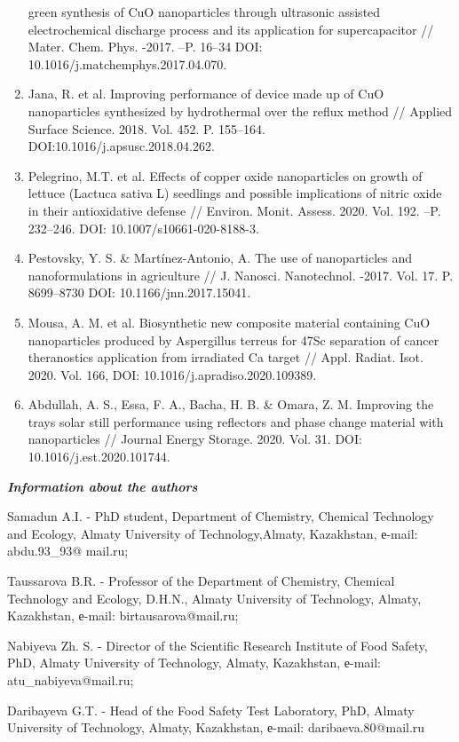 \begin{enumerate}
  green synthesis of CuO nanoparticles through ultrasonic assisted
  electrochemical discharge process and its application for
  supercapacitor // Mater. Chem. Phys. -2017. --P. 16--34 DOI:
  10.1016/j.matchemphys.2017.04.070.
\item
  Jana, R. et al. Improving performance of device made up of CuO
  nanoparticles synthesized by hydrothermal over the reflux method //
  Applied Surface Science. 2018. Vol. 452. P. 155--164.
  DOI:10.1016/j.apsusc.2018.04.262.
\item
  Pelegrino, M.T. et al. Effects of copper oxide nanoparticles on growth
  of lettuce (Lactuca sativa L) seedlings and possible implications of
  nitric oxide in their antioxidative defense // Environ. Monit. Assess.
  2020. Vol. 192. --P. 232--246. DOI: 10.1007/s10661-020-8188-3.
\item
  Pestovsky, Y. S. \& Martínez-Antonio, A. The use of nanoparticles and
  nanoformulations in agriculture // J. Nanosci. Nanotechnol. -2017.
  Vol. 17. P. 8699--8730 DOI: 10.1166/jnn.2017.15041.
\item
  Mousa, A. M. et al. Biosynthetic new composite material containing CuO
  nanoparticles produced by Aspergillus terreus for 47Sc separation of
  cancer theranostics application from irradiated Ca target // Appl.
  Radiat. Isot. 2020. Vol. 166, DOI: 10.1016/j.apradiso.2020.109389.
\item
  Abdullah, A. S., Essa, F. A., Bacha, H. B. \& Omara, Z. M. Improving
  the trays solar still performance using reflectors and phase change
  material with nanoparticles // Journal Energy Storage. 2020. Vol. 31.
  DOI: 10.1016/j.est.2020.101744.
\end{enumerate}

\emph{{\bfseries Information about the authors}}

Samadun A.I. - PhD student, Department of Chemistry, Chemical Technology
and Ecology, Almaty University of Technology,Almaty, Kazakhstan, е-mail:
abdu.93\_93@ mail.ru;

Taussarova B.R. - Professor of the Department of Chemistry, Chemical
Technology and Ecology, D.H.N., Almaty University of Technology, Almaty,
Kazakhstan, е-mail: birtausarova@mail.ru;

Nabiyeva Zh. S. - Director of the Scientific Research Institute of Food
Safety, PhD, Almaty University of Technology, Almaty, Kazakhstan,
е-mail: atu\_nabiyeva@mail.ru;

Daribayeva G.T. - Head of the Food Safety Test Laboratory, PhD, Almaty
University of Technology, Almaty, Kazakhstan, е-mail:
daribaeva.80@mail.ru

